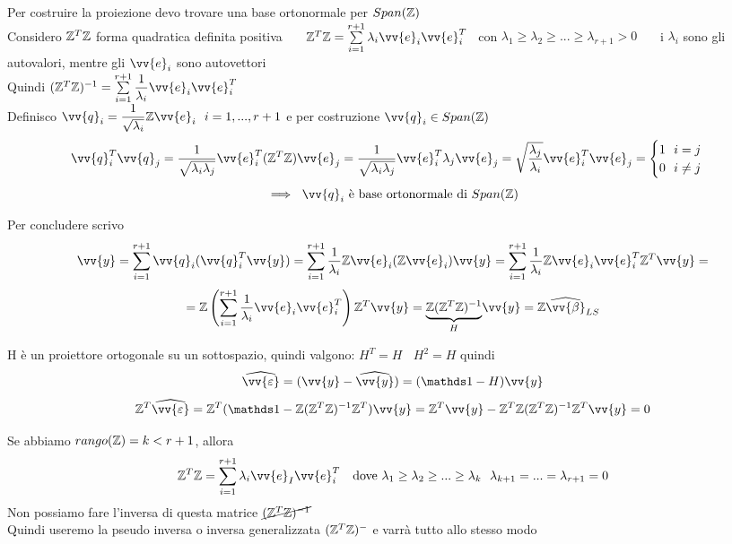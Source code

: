 \begin{Dim}[*]
Per costruire la proiezione devo trovare una base ortonormale per $Span(\mathbb Z)$\\
Considero $\mathbb Z^T\mathbb Z$ forma quadratica definita positiva \ \ \ $\ZZ^T\ZZ=\Sum{i=1}{r+1}\lambda_i\vv{e}_i\vv{e}_i^T$ \ con $\lambda_1\ge \lambda_2 \ge ... \ge \lambda_{r+1}>0$ \ \ \ i $\lambda_i$ sono gli autovalori, mentre gli $\vv{e}_i$ sono autovettori\\

Quindi $(\ZZ^T\ZZ)^{-1}= \Sum{i=1}{r+1} \frac{1}{\lambda_i}\vv{e}_i \vv{e}_i^T$\\

Definisco $\vv{q}_i=\frac{1}{\sqrt{\lambda_i}}\ZZ \vv{e}_i \ \ i=1, ..., r+1$ e per costruzione $\vv{q}_i\in Span(\ZZ)$
\[
\vv{q}_i^T\vv{q}_j=\frac{1}{\sqrt{\lambda_i\lambda_j}}\vv{e}_i^T(\ZZ^T\ZZ)\vv{e}_j = \frac{1}{\sqrt{\lambda_i\lambda_j}}\vv{e}_i^T\lambda_j\vv{e}_j = \sqrt{\frac{\lambda_j}{\lambda_i}}\vv{e}_i^T\vv{e}_j= \begin{cases}
1 \ \ i=j\\
0 \ \ i\ne j
\end{cases}
\]
\[
\implies \ \vv{q}_i \text{ è base ortonormale di } Span(\ZZ)
\]

Per concludere scrivo
\[
\vv{y}=\Sum{i=1}{r+1} \vv{q}_i(\vv{q}_i^T \vv{y}) = \Sum{i=1}{r+1} \frac{1}{\lambda_i}\ZZ \vv{e}_i (\ZZ \vv{e}_i)\vv{y} = \Sum{i=1}{r+1}\frac{1}{\lambda_i}\ZZ \vv{e}_i\vv{e}_i^T \ZZ^T\vv{y} =
\]
\[
= \ZZ\O \Sum{i=1}{r+1} \frac{1}{\lambda_i}\vv{e}_i\vv{e}_i^T \C\ZZ^T\vv{y} = \UB{H}{\ZZ(\ZZ^T\ZZ)^{-1}}\vv{y}=\ZZ \hat{\vv{\beta}}_{LS}
\]

H è un proiettore ortogonale su un sottospazio, quindi valgono:
$H^T=H \ \ \ \ H^2=H$ quindi
\[
\hat{\vv{\eps}} = (\vv{y}-\hat{\vv{y}})= (\II-H)\vv{y}
\]
\[
\ZZ^T\hat{\vv{\eps}}= \ZZ^T(\II-\ZZ(\ZZ^T\ZZ)^{-1}\ZZ^T)\vv{y} = \ZZ^T \vv{y} - \ZZ^T\ZZ(\ZZ^T\ZZ)^{-1}\ZZ^T\vv{y}=0
\]

\end{Dim}




Se abbiamo $rango(\mathbb Z)=k<r+1$, allora
\[
\ZZ^T\ZZ=\Sum{i=1}{r+1}\lambda_i\vv{e}_I\vv{e}_i^T \ \ \text{ dove } \lambda_1\ge\lambda_2\ge...\ge\lambda_k \ \ \lambda_{k+1}=...=\lambda_{r+1}=0
\]
Non possiamo fare l'inversa di questa matrice $\cancel{(\mathbb Z^T\mathbb Z)^{-1}}$\\
Quindi useremo la pseudo inversa o inversa generalizzata $(\mathbb Z^T\mathbb Z)^-$ e varrà tutto allo stesso modo\\

